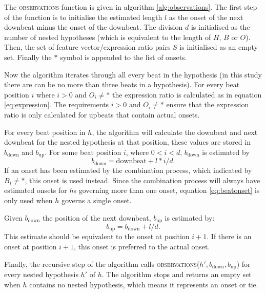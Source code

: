 The \textsc{observations} function is given in algorithm \ref{alg:observations}. The first step of the function is to initialise the estimated length $l$ as the onset of the next downbeat minus the onset of the downbeat. The division $d$ is initialised as the number of nested hypotheses (which is equivalent to the length of $H$, $B$ or $O$). Then, the set of feature vector/expression ratio pairs $S$ is initialised as an empty set. Finally the $*$ symbol is appended to the list of onsets.

Now the algorithm iterates through all every beat in the hypothesis (in this study there are can be no more than three beats in a hypothesis). For every beat position $i$ where $i > 0$ and $O_i \neq *$ the expression ratio is calculated as in equation \ref{eq:expression}. The requirements $i > 0$ and $O_i \neq *$ ensure that the expression ratio is only calculated for upbeats that contain actual onsets. 

For every beat position in $h$, the algorithm will calculate the downbeat and next downbeat for the nested hypothesis at that position, these values are stored in $b_{\mathrm{down}}$ and $b_{\mathrm{up}}$. 
For some beat position $i$, where $0 < i < d$, $b_{\mathrm{down}}$ is estimated by
\begin{equation}
\label{eq:beatonset}
b_{\mathrm{down}} = \mathrm{downbeat} + l * i/d.
\end{equation}
If an onset has been estimated by the combination process, which indicated by $B_i \neq *$, this onset is used instead. Since the combination process will always have estimated onsets for $h$s governing more than one onset, equation \ref{eq:beatonset} is only used when $h$ governs a single onset.

Given $b_{\mathrm{down}}$ the position of the next downbeat, $b_{\mathrm{up}}$ is estimated by:
\begin{equation}
b_{\mathrm{up}} = b_{\mathrm{down}} + l/d.
\end{equation}
This estimate should be equivalent to the onset at position $i+1$. If there is an onset at position $i+1$, this onset is preferred to the actual onset.

Finally, the recursive step of the algorithm calls \textsc{observations}($h', b_{\mathrm{down}}, b_{\mathrm{up}}$) for every nested hypothesis $h'$ of $h$. The algorithm stops and returns an empty set when $h$ contains no nested hypothesis, which means it represents an onset or tie.


